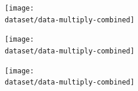 \begin{figure}[t]
	\begin{subfigure}{0.48\textwidth}
		\def\dataset{\bostonvar}
		\def\dataname{\bostonname}
		\centering
		\texttt{[image: \\dataset/data-multiply-combined]}
		\caption{\dataname}
		\label{fig:data_multiply_\dataset}
	\end{subfigure}
%	
	\begin{subfigure}{0.48\textwidth}
		\def\dataset{\energyvar}
		\def\dataname{\energyname}
		\centering
		\texttt{[image: \\dataset/data-multiply-combined]}
		\caption{\dataname}
		\label{fig:data_multiply_\dataset}
	\end{subfigure}
%	
%	
	\begin{subfigure}{0.48\textwidth}
		\def\dataset{\winevar}
		\def\dataname{\winename}
		\centering
		\texttt{[image: \\dataset/data-multiply-combined]}
		\caption{\dataname}
		\label{fig:data_multiply_\dataset}
	\end{subfigure}
	\begin{subfigure}{0.48\textwidth}

\end{subfigure}
\end{figure}
